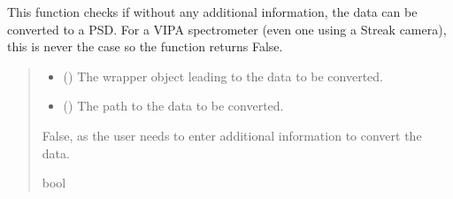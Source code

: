 \documentclass[letterpaper,10pt,english]{sphinxmanual}
\begin{document}
\begin{fulllineitems}
\label{\detokenize{_autosummary/HDF5_BLS.conversion_PSD:HDF5_BLS.conversion_PSD.check_conversion_Streak_VIPA}}
\pysigstartsignatures
\pysiglinewithargsret
{}
{\sphinxparamcomma {}}
{}
\pysigstopsignatures
\sphinxAtStartPar
This function checks if without any additional information, the data can be converted to a PSD. For a VIPA spectrometer (even one using a Streak camera), this is never the case so the function returns False.
\begin{quote}\begin{description}
\begin{itemize}
\item {} 
\sphinxAtStartPar
{} ({\hyperref[\detokenize{_autosummary/HDF5_BLS.wrapper:HDF5_BLS.wrapper.Wrapper}]{}}) \textendash{} The wrapper object leading to the data to be converted.

\item {} 
\sphinxAtStartPar
{} () \textendash{} The path to the data to be converted.

\end{itemize}

\sphinxAtStartPar
False, as the user needs to enter additional information to convert the data.

\sphinxAtStartPar
bool

\end{description}\end{quote}

\end{fulllineitems}

\end{document}
